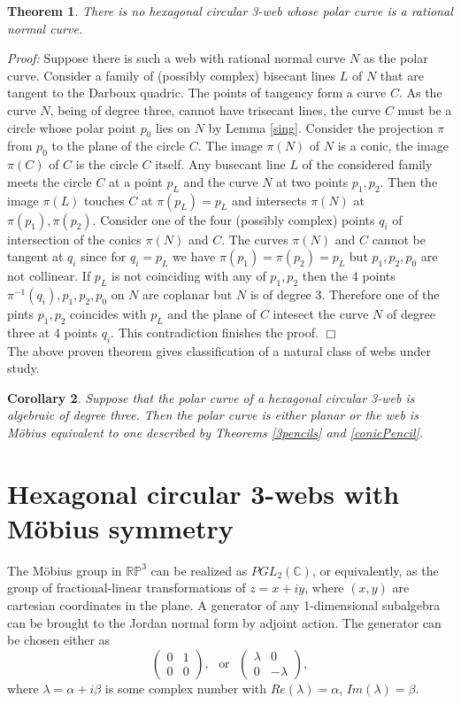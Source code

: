 \documentclass[11pt,a4paper]{article}
\newtheorem{theorem}{Theorem}
\newtheorem{corollary}[theorem]{Corollary}
\begin{document}
\begin{theorem}
There is no hexagonal circular 3-web whose polar curve is a rational normal curve.
\end{theorem}
{\it Proof:} Suppose there is such a web with rational normal curve $N$ as the polar curve. Consider a family of (possibly complex) bisecant lines $L$ of $N$ that are tangent to the Darboux quadric. The points of tangency form a curve $C$.  As the curve $N$, being of degree three, cannot have trisecant lines, the curve $C$ must be a circle whose polar point $p_0$ lies on $N$ by Lemma \ref{sing}. Consider the projection $\pi$ from $p_0$ to the plane of the circle $C$. The image $\pi(N)$ of $N$ is a conic, the image $\pi(C)$ of $C$ is the circle $C$ itself. Any busecant line $L$ of the considered family meets the circle $C$ at a point $p_L$ and the curve $N$ at two points $p_1,p_2$. Then the image $\pi(L)$ touches $C$ at $\pi(p_L)=p_L$ and intersects $\pi(N)$ at $\pi(p_1),\pi(p_2)$. Consider one of the four (possibly complex) points $q_i$ of intersection of the conics $\pi(N)$ and $C$. The curves $\pi(N)$ and $C$ cannot be tangent at $q_i$ since for $q_i=p_L$ we have $\pi(p_1)=\pi(p_2)=p_L$ but $p_1,p_2,p_0$ are not collinear. If $p_L$ is not coinciding with any of $p_1,p_2$ then the 4 points $\pi^{-1}(q_i),p_1,p_2,p_0$ on $N$ are coplanar but $N$ is of degree 3.  Therefore  one of the pints $p_1,p_2$ coincides with $p_L$ and the plane of $C$ intesect the curve $N$ of degree three at 4 points $q_i$. This contradiction finishes the proof.          
\hfill $\Box$\\

\noindent The above proven theorem gives classification of a natural class of webs under study. 
\begin{corollary}
Suppose that the polar curve of a hexagonal circular 3-web is algebraic of degree three. Then the polar curve is either planar or the web is Möbius equivalent to one described by Theorems \ref{3pencils} and \ref{conicPencil}.  
\end{corollary}





\section{Hexagonal circular 3-webs with  Möbius symmetry}\label{symetric webs}
 
The Möbius group in $\mathbb{RP}^3$ can be realized as $PGL_2(\mathbb{C})$, or equivalently, as the group of fractional-linear transformations of $z=x+iy$, where $(x,y)$ are cartesian coordinates in the plane. A generator of any  1-dimensional subalgebra  can be brought to  the Jordan normal form by adjoint action. The generator can be chosen either as  
$$
\left( 
\begin{array}{cc}
0&1\\
0&0
\end{array}
\right),\ \ \ 
\mbox{or} \ \ \ 
\left( 
\begin{array}{cc}
\lambda &0\\
0&-\lambda
\end{array}
\right),
$$
where $\lambda=\alpha+i\beta$ is some complex number with $Re(\lambda)=\alpha$, $Im(\lambda)=\beta$.
\end{document}
